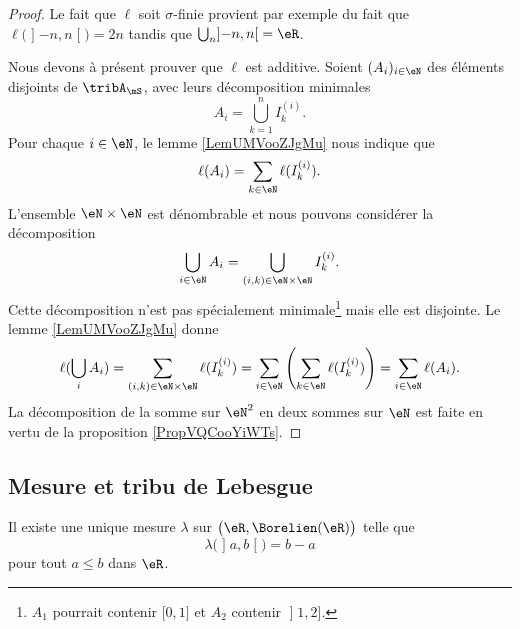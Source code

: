\begin{proof}
    Le fait que \( \ell\) soit \( \sigma\)-finie provient par exemple du fait que \( \ell\big( \mathopen] -n , n \mathclose[ \big)=2n\) tandis que \( \bigcup_n\mathopen] -n , n \mathclose[=\eR\).

        Nous devons à présent prouver que \( \ell\) est additive. Soient \( (A_i)_{i\in \eN}\) des éléments disjoints de \( \tribA_{\mS}\), avec leurs décomposition minimales
            \begin{equation}
                A_i=\bigcup_{k=1}^nI^{(i)}_k.
            \end{equation}
            Pour chaque \( i\in \eN\), le lemme \ref{LemUMVooZJgMu} nous indique que
            \begin{equation}
                \ell(A_i)=\sum_{k\in \eN}\ell(I^{(i)}_k).
            \end{equation}
            L'ensemble \( \eN\times \eN\) est dénombrable et nous pouvons considérer la décomposition 
            \begin{equation}
                \bigcup_{i\in \eN}A_i=\bigcup_{(i,k)\in \eN\times \eN}I^{(i)}_k.
            \end{equation}
            Cette décomposition n'est pas spécialement minimale\footnote{\( A_1\) pourrait contenir \( \mathopen[ 0 , 1 \mathclose]\) et \( A_2\) contenir \( \mathopen] 1 , 2 \mathclose]\).} mais elle est disjointe.
            Le lemme \ref{LemUMVooZJgMu} donne
            \begin{equation}
                \ell(\bigcup_i A_i)=\sum_{(i,k)\in \eN\times \eN}\ell(I_k^{(i)})=\sum_{i\in \eN}\left( \sum_{k\in \eN}\ell(I^{(i)}_k)\right)=\sum_{i\in \eN}\ell(A_i).
            \end{equation}
            La décomposition de la somme sur \( \eN^2\) en deux sommes sur \( \eN\) est faite en vertu de la proposition \ref{PropVQCooYiWTs}.
            
\end{proof}

\subsection{Mesure et tribu de Lebesgue}

\begin{theorem} \label{ThoDESooEyDOe}
    Il existe une unique mesure \( \lambda\) sur \( \big( \eR,\Borelien(\eR) \big)\) telle que
    \begin{equation}
        \lambda\big( \mathopen] a , b \mathclose[ \big)=b-a
    \end{equation}
    pour tout \( a\leq b\) dans \( \eR\).
\end{theorem}

